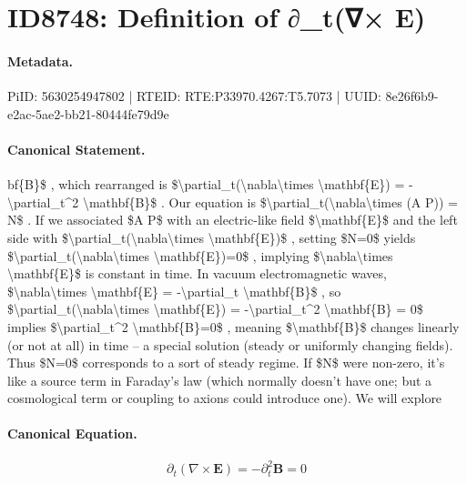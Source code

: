 \section*{ID8748: Definition of ∂\_t(∇× E)}
\paragraph{Metadata.}
PiID: 5630254947802 | RTEID: RTE:P33970.4267:T5.7073 | UUID: 8e26f6b9-e2ac-5ae2-bb21-80444fe79d9e

\paragraph{Canonical Statement.}
bf\{B\}\$ , which rearranged is \$\textbackslash{}partial\_t(\textbackslash{}nabla\textbackslash{}times \textbackslash{}mathbf\{E\}) = -\textbackslash{}partial\_t\textasciicircum{}2 \textbackslash{}mathbf\{B\}\$ . Our equation is \$\textbackslash{}partial\_t(\textbackslash{}nabla\textbackslash{}times (A P)) = N\$ . If we associated \$A P\$ with an electric-like field \$\textbackslash{}mathbf\{E\}\$ and the left side with \$\textbackslash{}partial\_t(\textbackslash{}nabla\textbackslash{}times \textbackslash{}mathbf\{E\})\$ , setting \$N=0\$ yields \$\textbackslash{}partial\_t(\textbackslash{}nabla\textbackslash{}times \textbackslash{}mathbf\{E\})=0\$ , implying \$\textbackslash{}nabla\textbackslash{}times \textbackslash{}mathbf\{E\}\$ is constant in time. In vacuum electromagnetic waves, \$\textbackslash{}nabla\textbackslash{}times \textbackslash{}mathbf\{E\} = -\textbackslash{}partial\_t \textbackslash{}mathbf\{B\}\$ , so \$\textbackslash{}partial\_t(\textbackslash{}nabla\textbackslash{}times \textbackslash{}mathbf\{E\}) = -\textbackslash{}partial\_t\textasciicircum{}2 \textbackslash{}mathbf\{B\} = 0\$ implies \$\textbackslash{}partial\_t\textasciicircum{}2 \textbackslash{}mathbf\{B\}=0\$ , meaning \$\textbackslash{}mathbf\{B\}\$ changes linearly (or not at all) in time – a special solution (steady or uniformly changing fields). Thus \$N=0\$ corresponds to a sort of steady regime. If \$N\$ were non-zero, it’s like a source term in Faraday’s law (which normally doesn’t have one; but a cosmological term or coupling to axions could introduce one). We will explore

\paragraph{Canonical Equation.}
\[
\partial_t(\nabla\times \mathbf{E}) = -\partial_t^2 \mathbf{B} = 0
\]

